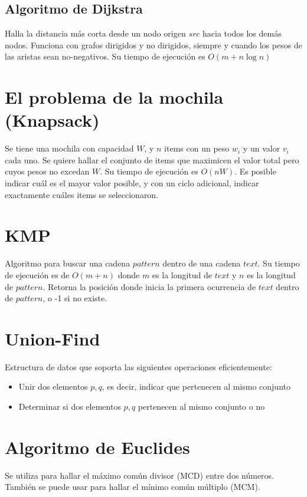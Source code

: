 \documentclass{article}
\begin{document}
\begin{multicols}{2}
	\subsection{Algoritmo de Dijkstra}
	Halla la distancia más corta desde un nodo origen \(src\) hacia todos los demás nodos. Funciona con grafos dirigidos y no dirigidos, siempre y cuando los pesos de las aristas sean no-negativos. Su tiempo de ejecución es \( O(m + n\log n) \)
	

\section{El problema de la mochila (Knapsack)}
Se tiene una mochila con capacidad \(W\), y \(n\) items con un peso \(w_i\) y un valor \(v_i\) cada uno. Se quiere hallar el conjunto de items que maximicen el valor total pero cuyos pesos no excedan \(W\). Su tiempo de ejecución es \( O(nW) \). Es posible indicar cuál es el mayor valor posible, y con un ciclo adicional, indicar exactamente cuáles items se seleccionaron.


\section{KMP}
Algoritmo para buscar una cadena \(pattern\) dentro de una cadena \(text\). Su tiempo de ejecución es de \( O(m+n) \) donde \(m\) es la longitud de \(text\) y \(n\) es la longitud de \(pattern\). Retorna la posición donde inicia la primera ocurrencia de \(text\) dentro de \(pattern\), o -1 si no existe.


\section{Union-Find}
Estructura de datos que soporta las siguientes operaciones eficientemente:
\begin{itemize}
\item Unir dos elementos \(p,q\), es decir, indicar que pertenecen al mismo conjunto
\item Determinar si dos elementos \(p,q\) pertenecen al mismo conjunto o no
\end{itemize}


\section{Algoritmo de Euclides}
Se utiliza para hallar el máximo común divisor (MCD) entre dos números. También se puede usar para hallar el mínimo común múltiplo (MCM).


\end{multicols}
\end{document}
